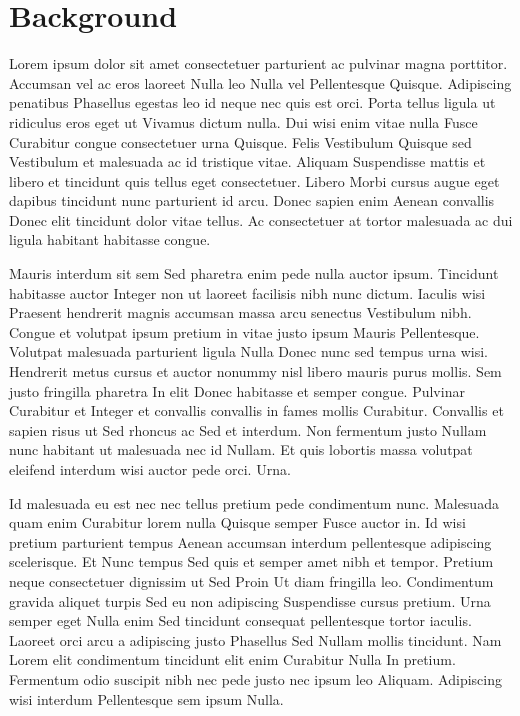 \chapter{Background} \label{chap:background}

Lorem ipsum dolor sit amet consectetuer parturient ac pulvinar magna porttitor. Accumsan vel ac eros laoreet Nulla leo Nulla vel Pellentesque Quisque. Adipiscing penatibus Phasellus egestas leo id neque nec quis est orci. Porta tellus ligula ut ridiculus eros eget ut Vivamus dictum nulla. Dui wisi enim vitae nulla Fusce Curabitur congue consectetuer urna Quisque. Felis Vestibulum Quisque sed Vestibulum et malesuada ac id tristique vitae. Aliquam Suspendisse mattis et libero et tincidunt quis tellus eget consectetuer. Libero Morbi cursus augue eget dapibus tincidunt nunc parturient id arcu. Donec sapien enim Aenean convallis Donec elit tincidunt dolor vitae tellus. Ac consectetuer at tortor malesuada ac dui ligula habitant habitasse congue. 

Mauris interdum sit sem Sed pharetra enim pede nulla auctor ipsum. Tincidunt habitasse auctor Integer non ut laoreet facilisis nibh nunc dictum. Iaculis wisi Praesent hendrerit magnis accumsan massa arcu senectus Vestibulum nibh. Congue et volutpat ipsum pretium in vitae justo ipsum Mauris Pellentesque. Volutpat malesuada parturient ligula Nulla Donec nunc sed tempus urna wisi. Hendrerit metus cursus et auctor nonummy nisl libero mauris purus mollis. Sem justo fringilla pharetra In elit Donec habitasse et semper congue. Pulvinar Curabitur et Integer et convallis convallis in fames mollis Curabitur. Convallis et sapien risus ut Sed rhoncus ac Sed et interdum. Non fermentum justo Nullam nunc habitant ut malesuada nec id Nullam. Et quis lobortis massa volutpat eleifend interdum wisi auctor pede orci. Urna.

Id malesuada eu est nec nec tellus pretium pede condimentum nunc. Malesuada quam enim Curabitur lorem nulla Quisque semper Fusce auctor in. Id wisi pretium parturient tempus Aenean accumsan interdum pellentesque adipiscing scelerisque. Et Nunc tempus Sed quis et semper amet nibh et tempor. Pretium neque consectetuer dignissim ut Sed Proin Ut diam fringilla leo. Condimentum gravida aliquet turpis Sed eu non adipiscing Suspendisse cursus pretium. Urna semper eget Nulla enim Sed tincidunt consequat pellentesque tortor iaculis. Laoreet orci arcu a adipiscing justo Phasellus Sed Nullam mollis tincidunt. Nam Lorem elit condimentum tincidunt elit enim Curabitur Nulla In pretium. Fermentum odio suscipit nibh nec pede justo nec ipsum leo Aliquam. Adipiscing wisi interdum Pellentesque sem ipsum Nulla.

